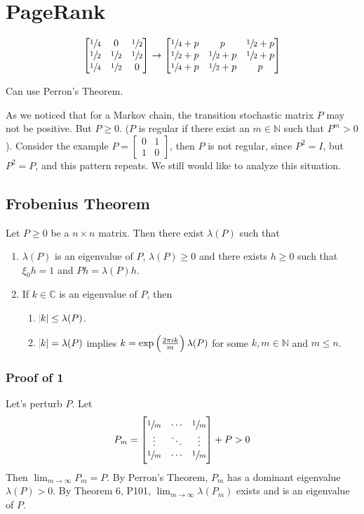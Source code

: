\documentclass{article}
\newcommand{\m}[1]{\begin{bmatrix} #1 \end{bmatrix}}
\newcommand{\sm}[1]{\left[\begin{smallmatrix} #1 \end{smallmatrix}\right]}
\newcommand{\CC}{\mathbb{C}}
\newcommand{\NN}{\mathbb{N}}
\begin{document}
\section{PageRank}

\[\m{\sfrac{1}{4} & 0 & \sfrac{1}{2}\\\sfrac{1}{2}  & \sfrac{1}{2} & \sfrac{1}{2}\\ \sfrac{1}{4} & \sfrac{1}{2} & 0} \to \m{\sfrac{1}{4} +p& p & \sfrac{1}{2}+p\\\sfrac{1}{2} +p & \sfrac{1}{2} +p& \sfrac{1}{2}+p\\ \sfrac{1}{4} +p& \sfrac{1}{2} +p& p}\]

Can use Perron's Theorem.


As we noticed that for a Markov chain, the transition stochastic matrix \( P\) may not be positive.
But \(P \geq 0\).
(\(P\) is regular if there exist an \(m \in \NN\) such that \(P^m > 0\)).
Consider the example \(P = \sm{0 & 1\\ 1 & 0}\), then \(P\) is not regular, since \(P^2 = I\), but \(P^2 = P\), and this pattern repeats.
We still would like to analyze this situation.

\subsection{Frobenius Theorem}

Let \(P \geq 0\) be a \(n\times n\) matrix.
Then there exist  \(\lambda(P)\) such that
\begin{enumerate}
\item \(\lambda(P)\) is an eigenvalue of \(P\), \(\lambda(P) \geq 0\) and there exists \( h \geq 0\) such that \(\xi_0h = 1\) and \(Ph = \lambda(P)h\).
\item If \(k \in \CC\) is an eigenvalue of \(P\), then
  \begin{enumerate}
  \item \(\abs{k} \leq \lambda(P)\).
  \item \(\abs{k} = \lambda(P)\) implies \(k = \exp\del{\frac{2\pi i k}{m}}\lambda(P)\) for some \(k, m \in \NN\) and \(m \leq n\).
  \end{enumerate}
\end{enumerate}

\subsubsection{Proof of 1}

Let's perturb \(P\).
Let \[P_m = \m{\sfrac{1}{m} & \cdots & \sfrac{1}{m} \\ \vdots & \ddots & \vdots \\\sfrac{1}{m} & \cdots & \sfrac{1}{m} } + P > 0\]
Then \(\lim_{m \to \infty}P_m = P\).
By Perron's Theorem, \(P_m\) has a dominant eigenvalue \(\lambda(P) > 0\).
By Theorem 6, P101, \(\lim_{m \to \infty} \lambda(P_m)\) exists and is an eigenvalue of \(P\).
\end{document}
